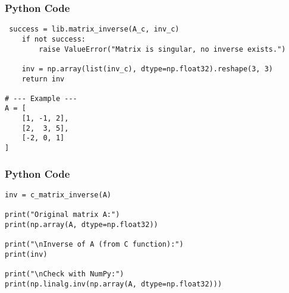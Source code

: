 \documentclass{beamer}
\begin{document}
\begin{frame}[fragile]
    \frametitle{Python Code}
    \begin{lstlisting}
 success = lib.matrix_inverse(A_c, inv_c)
    if not success:
        raise ValueError("Matrix is singular, no inverse exists.")

    inv = np.array(list(inv_c), dtype=np.float32).reshape(3, 3)
    return inv

# --- Example ---
A = [
    [1, -1, 2],
    [2,  3, 5],
    [-2, 0, 1]
]

    \end{lstlisting}
\end{frame}
\begin{frame}[fragile]
    \frametitle{Python Code}
    \begin{lstlisting}
inv = c_matrix_inverse(A)

print("Original matrix A:")
print(np.array(A, dtype=np.float32))

print("\nInverse of A (from C function):")
print(inv)

print("\nCheck with NumPy:")
print(np.linalg.inv(np.array(A, dtype=np.float32)))
    \end{lstlisting}
\end{frame}
\end{document}
